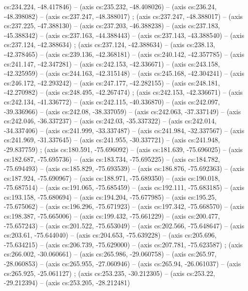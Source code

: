   cs:234.224, -48.417846) -- (axis cs:235.232, -48.408026) -- (axis cs:236.24,
  -48.398082) -- (axis cs:237.247, -48.388017) ; 
  (axis cs:237.247, -48.388017) -- (axis cs:237.225, -47.388130) -- (axis
  cs:237.203, -46.388238) -- (axis cs:237.183, -45.388342) -- (axis
  cs:237.163, -44.388443) -- (axis cs:237.143, -43.388540) -- (axis
  cs:237.124, -42.388634) ;  (axis cs:237.124,
  -42.388634) -- (axis cs:238.13, -42.378465) -- (axis cs:239.136, -42.368181)
  -- (axis cs:240.142, -42.357785) -- (axis cs:241.147, -42.347281) -- (axis
  cs:242.153, -42.336671) -- (axis cs:243.158, -42.325959) -- (axis
  cs:244.163, -42.315148) -- (axis cs:245.168, -42.304241) -- (axis
  cs:246.172, -42.293242) -- (axis cs:247.177, -42.282155) -- (axis
  cs:248.181, -42.270982) -- (axis cs:248.495, -42.267474)
  ;  (axis cs:242.153, -42.336671) -- (axis
  cs:242.134, -41.336772) -- (axis cs:242.115, -40.336870) -- (axis
  cs:242.097, -39.336966) -- (axis cs:242.08, -38.337059) -- (axis cs:242.063,
  -37.337149) -- (axis cs:242.046, -36.337237) -- (axis cs:242.03, -35.337322)
  -- (axis cs:242.014, -34.337406) -- (axis cs:241.999, -33.337487) -- (axis
  cs:241.984, -32.337567) -- (axis cs:241.969, -31.337645) -- (axis
  cs:241.955, -30.337721) -- (axis cs:241.948, -29.837759)
  ;  (axis cs:180.591, -75.696092) -- (axis
  cs:181.639, -75.696025) -- (axis cs:182.687, -75.695736) -- (axis
  cs:183.734, -75.695225) -- (axis cs:184.782, -75.694493) -- (axis
  cs:185.829, -75.693539) -- (axis cs:186.876, -75.692363) -- (axis
  cs:187.924, -75.690967) -- (axis cs:188.971, -75.689350) -- (axis
  cs:190.018, -75.687514) -- (axis cs:191.065, -75.685459) -- (axis
  cs:192.111, -75.683185) -- (axis cs:193.158, -75.680694) -- (axis
  cs:194.204, -75.677985) -- (axis cs:195.25, -75.675062) -- (axis cs:196.296,
  -75.671923) -- (axis cs:197.342, -75.668570) -- (axis cs:198.387,
  -75.665006) -- (axis cs:199.432, -75.661229) -- (axis cs:200.477,
  -75.657243) -- (axis cs:201.522, -75.653049) -- (axis cs:202.566,
  -75.648647) -- (axis cs:203.61, -75.644040) -- (axis cs:204.653, -75.639228)
  -- (axis cs:205.696, -75.634215) -- (axis cs:206.739, -75.629000) -- (axis
  cs:207.781, -75.623587) ;  (axis cs:266.002,
  -30.060661) -- (axis cs:265.986, -29.060758) -- (axis cs:265.97, -28.060853)
  -- (axis cs:265.955, -27.060946) -- (axis cs:265.94, -26.061037) -- (axis
  cs:265.925, -25.061127) ;  (axis cs:253.235,
  -30.212305) -- (axis cs:253.22, -29.212394) -- (axis cs:253.205, -28.212481)
